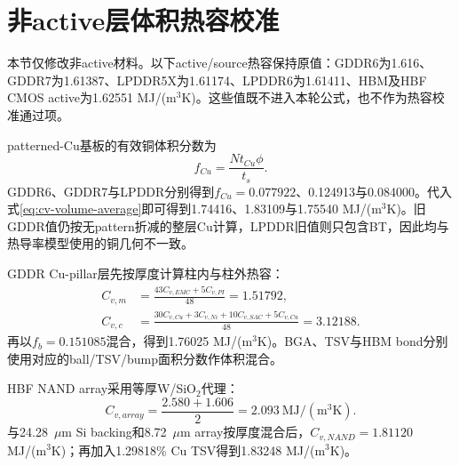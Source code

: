 \documentclass[UTF8,zihao=-4]{ctexart}
\begin{document}
\section{非active层体积热容校准}

本节仅修改非active材料。以下active/source热容保持原值：GDDR6为1.616、GDDR7为1.61387、LPDDR5X为1.61174、LPDDR6为1.61411、HBM及HBF CMOS active为1.62551 MJ/(m$^3$K)。这些值既不进入本轮公式，也不作为热容校准通过项。

patterned-Cu基板的有效铜体积分数为
\begin{equation}
  f_{Cu}=\frac{Nt_{Cu}\phi}{t_s}.
  \label{eq:cv-substrate-cu}
\end{equation}
GDDR6、GDDR7与LPDDR分别得到$f_{Cu}=0.077922$、0.124913与0.084000。代入式\eqref{eq:cv-volume-average}即可得到1.74416、1.83109与1.75540 MJ/(m$^3$K)。旧GDDR值仍按无pattern折减的整层Cu计算，LPDDR旧值则只包含BT，因此均与热导率模型使用的铜几何不一致。

GDDR Cu-pillar层先按厚度计算柱内与柱外热容：
\begin{align}
  C_{v,m}&=\frac{43C_{v,EMC}+5C_{v,PI}}{48}=1.51792,\\
  C_{v,c}&=\frac{30C_{v,Cu}+3C_{v,Ni}+10C_{v,SAC}+5C_{v,Cu}}{48}
          =3.12188.
\end{align}
再以$f_b=0.151085$混合，得到1.76025 MJ/(m$^3$K)。BGA、TSV与HBM bond分别使用对应的ball/TSV/bump面积分数作体积混合。

HBF NAND array采用等厚W/SiO$_2$代理：
\begin{equation}
  C_{v,array}=\frac{2.580+1.606}{2}=2.093~\mathrm{MJ/(m^3K)}.
\end{equation}
与24.28~$\mu$m Si backing和8.72~$\mu$m array按厚度混合后，$C_{v,NAND}=1.81120$ MJ/(m$^3$K)；再加入1.29818\% Cu TSV得到1.83248 MJ/(m$^3$K)。
\end{document}
